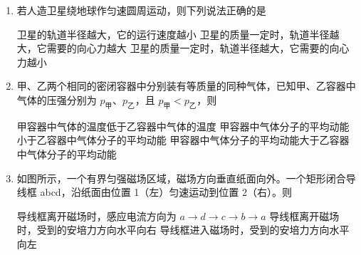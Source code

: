 \documentclass[\gkver]{gaokaozhenti}
\begin{document}
\begin{enumerate}
\item
若人造卫星绕地球作匀速圆周运动，则下列说法正确的是

{卫星的轨道半径越大，它的运行速度越小}
{卫星的质量一定时，轨道半径越大，它需要的向心力越大}
{卫星的质量一定时，轨道半径越大，它需要的向心力越小}


\item
甲、乙两个相同的密闭容器中分别装有等质量的同种气体，已知甲、乙容器中气体的压强分别为 $p_{\text{甲}}$、$p_{\text{乙}}$，且 $p_{\text{甲}}<p_{\text{乙}}$，则

{甲容器中气体的温度低于乙容器中气体的温度}
{甲容器中气体分子的平均动能小于乙容器中气体分子的平均动能}
{甲容器中气体分子的平均动能大于乙容器中气体分子的平均动能}


\item
如图所示，一个有界匀强磁场区域，磁场方向垂直纸面向外。一个矩形闭合导线框 abcd，沿纸面由位置 1（左）匀速运动到位置 2（右）。则

\onepicture[w=6.55cm]{}

{导线框离开磁场时，感应电流方向为 $a\to d\to c\to b\to a$}
{导线框离开磁场时，受到的安培力方向水平向右}
{导线框进入磁场时，受到的安培力方向水平向左}


\end{enumerate}
\end{document}
